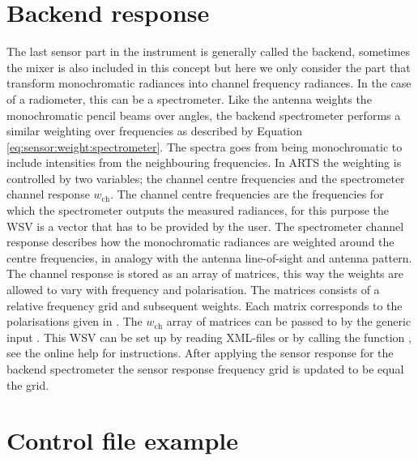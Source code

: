 \section{Backend response}
\label{sec:sensor:backend}
The last sensor part in the instrument is generally called the
backend, sometimes the mixer is also included in this concept but here
we only consider the part that transform monochromatic radiances into
channel frequency radiances. In the case of a radiometer, this can be
a spectrometer. Like the antenna weights the monochromatic pencil
beams over angles, the backend spectrometer performs a similar
weighting over frequencies as described by
Equation \ref{eq:sensor:weight:spectrometer}. The spectra goes from
being monochromatic to include intensities from the neighbouring
frequencies.  In ARTS the weighting is controlled by two variables;
the channel centre frequencies  and the spectrometer
channel response $w_\mathrm{ch}$. The channel centre frequencies are
the frequencies for which the spectrometer outputs the measured
radiances, for this purpose the WSV  is a vector
that has to be provided by the user.  The spectrometer channel
response describes how the monochromatic radiances are weighted around
the centre frequencies, in analogy with the antenna line-of-sight and
antenna pattern. The channel response is stored as an array of
matrices, this way the weights are allowed to vary with frequency and
polarisation. The matrices consists of a relative frequency grid and
subsequent weights. Each matrix corresponds to the polarisations given
in . The $w_\mathrm{ch}$ array of matrices can be passed to
 by the generic input
. This WSV can be set up by reading
XML-files or by calling the function , see
the online help for instructions.  After applying the sensor response
for the backend spectrometer the sensor response frequency grid is
updated to be equal the  grid.
% 
% 


\section{Control file example}

